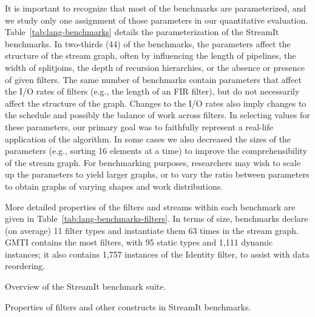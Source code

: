 It is important to recognize that most of the benchmarks are
parameterized, and we study only one assignment of those parameters in
our quantitative evaluation.  Table~\ref{tab:lang-benchmarks} details
the parameterization of the StreamIt benchmarks.  In two-thirds (44)
of the benchmarks, the parameters affect the structure of the stream
graph, often by influencing the length of pipelines, the width of
splitjoins, the depth of recursion hierarchies, or the absence or
presence of given filters.  The same number of benchmarks contain
parameters that affect the I/O rates of filters (e.g., the length of
an FIR filter), but do not necessarily affect the structure of the
graph.  Changes to the I/O rates also imply changes to the schedule
and possibly the balance of work across filters.  In selecting values
for these parameters, our primary goal was to faithfully represent a
real-life application of the algorithm.  In some cases we also
decreased the sizes of the parameters (e.g., sorting 16 elements at a
time) to improve the comprehensibility of the stream graph.  For
benchmarking purposes, researchers may wish to scale up the parameters
to yield larger graphs, or to vary the ratio between parameters to
obtain graphs of varying shapes and work distributions.

More detailed properties of the filters and streams within each
benchmark are given in Table~\ref{tab:lang-benchmarks-filters}.  In
terms of size, benchmarks declare (on average) 11 filter types and
instantiate them 63 times in the stream graph.  GMTI contains the most
filters, with 95 static types and 1,111 dynamic instances; it also
contains 1,757 instances of the Identity filter, to assist with data
reordering.


\begin{table*}[t!]
\hspace{-0.3in}
\vspace{-12pt}
\caption{Overview of the StreamIt benchmark suite.\protect\label{tab:lang-benchmarks}}
\vspace{-0.5in}
\end{table*}

\begin{table*}[t!]
\vspace{-12pt}
\caption{Properties of filters and other constructs in StreamIt 
benchmarks.\protect\label{tab:lang-benchmarks-filters}}
\vspace{-0.5in}
\end{table*}
